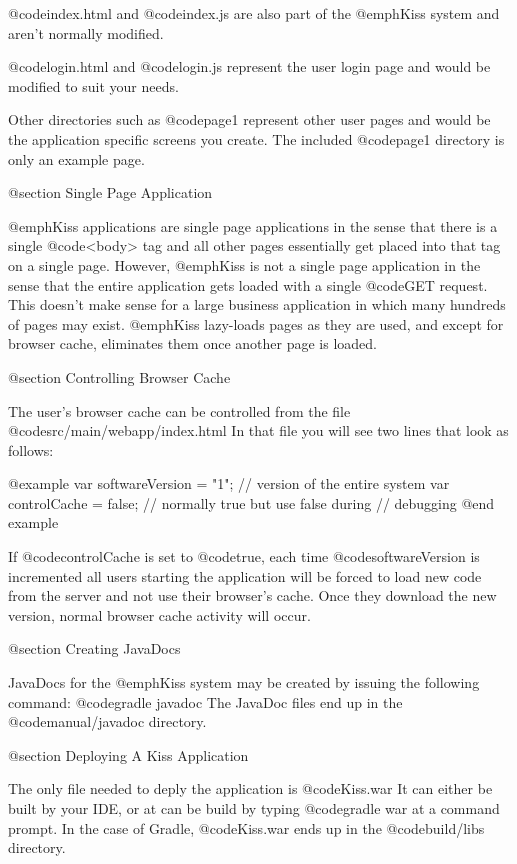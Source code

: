 @code{index.html} and @code{index.js} are also part of the @emph{Kiss} system and aren't normally modified.

@code{login.html} and @code{login.js} represent the user login page and would be modified to suit your needs.

Other directories such as @code{page1} represent other user pages and would be the application specific screens you create.  The included @code{page1} directory is only an example page.


@section Single Page Application

@emph{Kiss} applications are single page applications in the sense
that there is a single @code{<body>} tag and all other pages
essentially get placed into that tag on a single page.  However,
@emph{Kiss} is not a single page application in the sense that the
entire application gets loaded with a single @code{GET} request.  This
doesn't make sense for a large business application in which many
hundreds of pages may exist.  @emph{Kiss} lazy-loads pages as they are
used, and except for browser cache, eliminates them once another page
is loaded.

@section Controlling Browser Cache

The user's browser cache can be controlled from the file @code{src/main/webapp/index.html}  In that file you will see two lines that look as follows:

@example
var softwareVersion = "1";  // version of the entire system
var controlCache = false;   // normally true but use false during 
                            // debugging
@end example

If @code{controlCache} is set to @code{true}, each time @code{softwareVersion}
is incremented all users starting the application will be forced to
load new code from the server and not use their browser's cache.  Once
they download the new version, normal browser cache activity will
occur.


@section Creating JavaDocs

JavaDocs for the @emph{Kiss} system may be created by issuing the
following command: @code{gradle javadoc} The JavaDoc files end up in
the @code{manual/javadoc} directory.


@section Deploying A Kiss Application

The only file needed to deply the application is @code{Kiss.war} It
can either be built by your IDE, or at can be build by typing
@code{gradle war} at a command prompt.  In the case of Gradle,
@code{Kiss.war} ends up in the @code{build/libs} directory.

